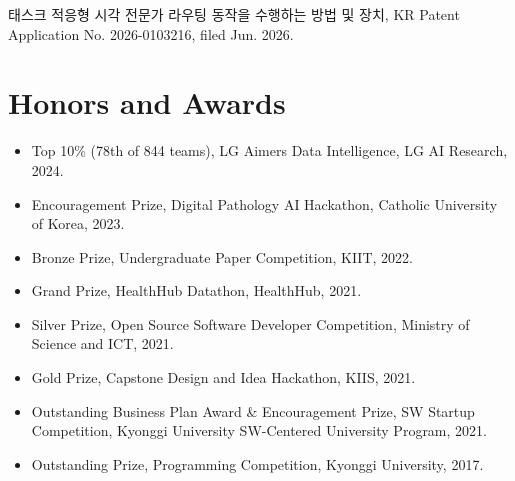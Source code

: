 \documentclass[a4paper,11pt]{article}
\begin{document}
\noindent
태스크 적응형 시각 전문가 라우팅 동작을 수행하는 방법 및 장치,
KR Patent Application No. 2026-0103216, filed Jun. 2026.


\section{\textbf{Honors and Awards}}

\begin{itemize}[leftmargin=0pt,label={}]
\item Top 10\% (78th of 844 teams), LG Aimers Data Intelligence, LG AI Research, 2024.
\item Encouragement Prize, Digital Pathology AI Hackathon, Catholic University of Korea, 2023.
\item Bronze Prize, Undergraduate Paper Competition, KIIT, 2022.
\item Grand Prize, HealthHub Datathon, HealthHub, 2021.
\item Silver Prize, Open Source Software Developer Competition, Ministry of Science and ICT, 2021.
\item Gold Prize, Capstone Design and Idea Hackathon, KIIS, 2021.
\item Outstanding Business Plan Award \& Encouragement Prize, SW Startup Competition, Kyonggi University SW-Centered University Program, 2021.
\item Outstanding Prize, Programming Competition, Kyonggi University, 2017.
\end{itemize}

\end{document}
